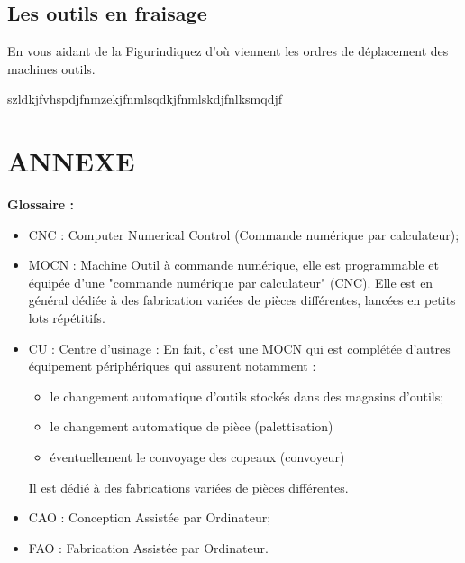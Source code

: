 \documentclass[12pt]{article}
\newcounter{exo}
\newenvironment{exo}{\stepcounter{exo}\vspace{0.5cm}{\bfseries Question \theexo\ :}}{\par\vspace{0.5cm}}
\begin{document}
\subsection{Les outils en fraisage}


\begin{exo}\label{exo1} En vous aidant de la Figurindiquez d'où viennent les ordres de déplacement des machines outils.\end{exo}


\begin{tcolorbox}[colback=blue!5!white,colframe=red!75!black]
  \bcinfo szldkjfvhspdjfnmzekjfnmlsqdkjfnmlskdjfnlksmqdjf
\end{tcolorbox}


\section{ANNEXE}
\begin{tcolorbox}[colback=blue!5!white,colframe=orange!75!black]
\begin{center}
    \textbf{Glossaire :}
\end{center}
\begin{itemize}
    \item CNC : Computer Numerical Control (Commande numérique par calculateur);
    \item MOCN : Machine Outil à commande numérique, elle est programmable et équipée d'une "commande numérique par calculateur" (CNC). Elle est en général dédiée à des fabrication variées de pièces différentes, lancées en petits lots répétitifs.
    \item CU : Centre d'usinage : En fait, c'est une MOCN qui est complétée d'autres équipement périphériques qui assurent notamment : \begin{itemize}
        \item le changement automatique d'outils stockés dans des magasins d'outils;
        \item le changement automatique de pièce (palettisation)
        \item éventuellement le convoyage des copeaux (convoyeur)
    \end{itemize}
    Il est dédié à des fabrications variées de pièces différentes.
    \item CAO : Conception Assistée par Ordinateur;
    \item FAO : Fabrication Assistée par Ordinateur.
\end{itemize}
\end{tcolorbox}
\end{document}
